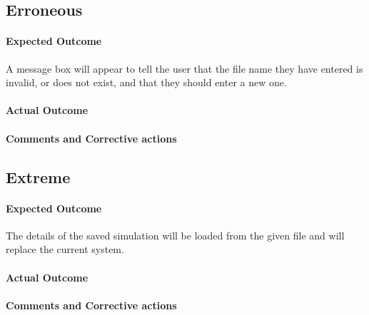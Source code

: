 \subsection{Erroneous}
\paragraph{Expected Outcome}
A message box will appear to tell the user that the file name they have entered
is invalid, or does not exist, and that they should enter a new one.
\paragraph{Actual Outcome}
\paragraph{Comments and Corrective actions}

\subsection{Extreme}
\paragraph{Expected Outcome}
The details of the saved simulation will be loaded from the given file and will
replace the current system.
\paragraph{Actual Outcome}
\paragraph{Comments and Corrective actions}


